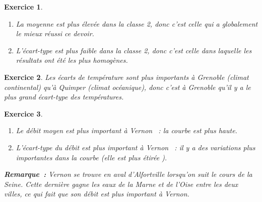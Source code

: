 \documentclass[10pt]{article}
\newtheorem{exo}{Exercice}
\begin{document}
\begin{exo}

\begin{enumerate}
\item La moyenne est plus élevée dans la classe 2, donc c'est celle qui a globalement le mieux réussi ce devoir.
\item L'écart-type est plus faible dans la classe 2, donc c'est celle dans laquelle les résultats ont été les plus homogènes.
\end{enumerate}


\end{exo}

\begin{exo}

Les écarts de température sont plus importants à Grenoble (climat continental) qu'à Quimper (climat océanique), donc c'est à Grenoble qu'il y a le plus grand écart-type des températures.
\end{exo}

\begin{exo}
\begin{enumerate}
\item Le débit moyen est plus important à Vernon ~: la courbe est plus haute.
\item L'écart-type du débit est  plus important à Vernon ~: il y a des variations plus importantes dans la courbe (elle est plus \og étirée \fg).
\end{enumerate}

\medskip

\textbf{Remarque~:} Vernon se trouve en aval d'Alfortville lorsqu'on suit le cours de la Seine. Cette dernière gagne les eaux de la Marne et de l'Oise entre les deux villes, ce qui fait que son débit est plus important à Vernon.
\end{exo}
\end{document}
